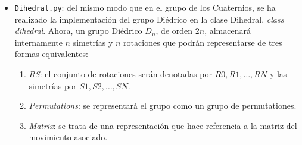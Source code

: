 \begin{itemize}
\begin{itemize}
    
    
\item 
Por último, se ha programado la función \textit{QuaternionGroupGeneralised(n)} que define el grupo generalizado de los Cuaternios, con presentación:
\begin{align*}
    Q_n = \langle a,b \mid a^n = b^2, a^{2n}=1,
b^{-1}ab=a^{-1} \rangle \, .
\end{align*}
Cuando $n=2$ se tiene el grupo de los Cuaternios.
    \begin{tcolorbox}[breakable, size=fbox, boxrule=1pt, pad at break*=1mm,colback=cellbackground, colframe=cellborder]
\begin{Verbatim}[commandchars=\\\{\}]
\PY{n}{Q3} \PY{o}{=} \PY{n}{QuaternionGroupGeneralised}\PY{p}{(}\PY{n}{2}\PY{p}{)}
\PY{n}{Q3}\PY{o}{.}\PY{n}{is\PYZus{}isomorphic}\PY{p}{(}\PY{n}{Q}\PY{p}{)}
\end{Verbatim}
\end{tcolorbox}

\begin{tcolorbox}[breakable, size=fbox, boxrule=.5pt, pad at break*=1mm, opacityfill=0]
\begin{Verbatim}[commandchars=\\\{\}]
True
\end{Verbatim}
\end{tcolorbox}

\end{itemize}
        


    
    
    
    
  \newpage  
\item  \texttt{Dihedral.py}: del mismo modo que en el grupo de los
  Cuaternios, se ha realizado la implementación del grupo Diédrico en la
  clase Dihedral, \textit{class dihedral}. Ahora, un grupo Diédrico  $D_n$, de orden $2n$, almacenará internamente $n$ simetrías y  $n$ rotaciones que podrán representarse de tres formas equivalentes:

  \begin{enumerate}
  \item \textit{RS}: el conjunto de rotaciones serán denotadas por
    $R0, R1, \ldots, RN$ y las simetrías por $S1, S2,\ldots, SN$.
  \item \textit{Permutations}: se representará el grupo como un grupo de
    permutationes.
  \item \textit{Matrix}: se trata de una representación que hace
    referencia a la matriz del movimiento asociado.



\end{enumerate}
\end{itemize}
